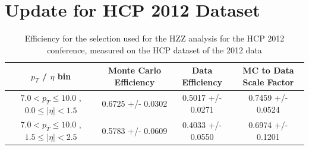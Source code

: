 \documentclass{cmspaper}
\begin{document}
\section{Update for HCP 2012 Dataset}


 \begin{table}[!ht]
 \begin{center} 
 \begin{tabular}{|c|c|c|c|}
 \hline
 $p_{T}$ / $\eta$ bin    &  Monte Carlo Efficiency    &  Data Efficiency   &  MC to Data Scale Factor \\   \hline           
$  7.0 < p_{T} \le  10.0$ , $  0.0  \le |\eta| <   1.5$   &       0.6725 +/- 0.0302   &       0.5017 +/- 0.0271   &       0.7459 +/- 0.0524   \\   
\hline
$  7.0 < p_{T} \le  10.0$ , $  1.5  \le |\eta| <   2.5$   &       0.5783 +/- 0.0609   &       0.4033 +/- 0.0550   &       0.6974 +/- 0.1201   \\   
\hline
\end{tabular}
\caption{ Efficiency for the selection used for the HZZ analysis for the HCP 2012 conference, measured on the HCP dataset of the 2012 data }
\label{tab:Efficiency_HZZICHEP2012WP_HCP2012}
\end{center}
\end{table}
\end{document}
